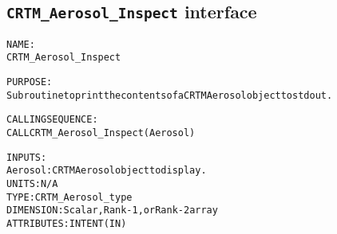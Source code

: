 \subsection{\texttt{CRTM\_Aerosol\_Inspect} interface}
  \label{sec:CRTM_Aerosol_Inspect_interface}
  \begin{alltt}
 
  NAME:
        CRTM_Aerosol_Inspect
 
  PURPOSE:
        Subroutine to print the contents of a CRTM Aerosol object to stdout.
 
  CALLING SEQUENCE:
        CALL CRTM_Aerosol_Inspect( Aerosol )
 
  INPUTS:
        Aerosol:       CRTM Aerosol object to display.
                       UNITS:      N/A
                       TYPE:       CRTM_Aerosol_type
                       DIMENSION:  Scalar, Rank-1, or Rank-2 array
                       ATTRIBUTES: INTENT(IN)
 
  \end{alltt}
